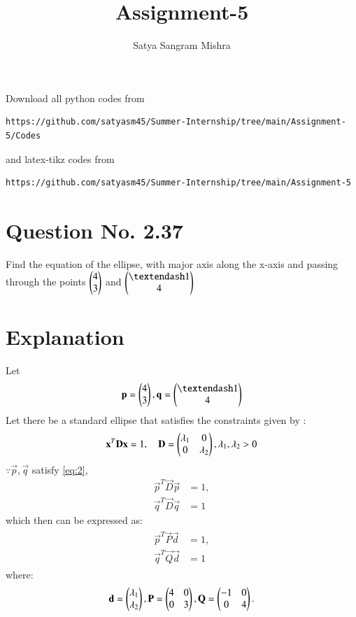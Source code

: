 \documentclass[journal,12pt,twocolumn]{IEEEtran}
\begin{document}
     \def\centbox#1{\makebox[0in]{#1}}
     \def\topbox#1{\raisebox{-\baselineskip}[0in][0in]{#1}}
     \def\midbox#1{\raisebox{-0.5\baselineskip}[0in][0in]{#1}}
\vspace{3cm}
\title{Assignment-5}
\author{Satya Sangram Mishra}
\maketitle
\newpage
\bigskip
\renewcommand{\thefigure}{\theenumi}
\renewcommand{\thetable}{\theenumi}
Download all python codes from 
\begin{lstlisting}
https://github.com/satyasm45/Summer-Internship/tree/main/Assignment-5/Codes
\end{lstlisting}
%
and latex-tikz codes from 
%
\begin{lstlisting}
https://github.com/satyasm45/Summer-Internship/tree/main/Assignment-5
\end{lstlisting}
%
\section{Question No. 2.37}
Find the equation of the ellipse, with major axis along the x-axis and passing through the points $\begin{pmatrix}4\\3\end{pmatrix}$  and $\myvec{– 1\\4}$ 
%
\section{Explanation}
Let 
\begin{align}
\vec{p} = \myvec{4\\3} , \vec{q} = \myvec{– 1\\4}
\end{align}
Let there be a standard ellipse that satisfies the constraints given by :
\begin{align}
\label{eq:2}
\mathbf{x}^T\mathbf{D}\mathbf{x} = 1, \quad \mathbf{D} = \begin{pmatrix}\lambda_1 & 0 \\ 0 & \lambda_2\end{pmatrix}, \lambda_1,\lambda_2 > 0
\end{align}
$\because \vec{p}, \vec{q}$ satisfy \eqref{eq:2},
\begin{align}
\label{eq:ellipse_std_ab}
\vec{p}^T\vec{D}\vec{p} &= 1,
\\
\vec{q}^T\vec{D}\vec{q} &= 1
\end{align}
which then can be expressed as:
\begin{align}
\label{eq:5}
\begin{split}
\vec{p}^T\vec{P}\vec{d} &= 1,
\\
\vec{q}^T\vec{Q}\vec{d} &= 1
\end{split}
\end{align}
where:
\begin{align}
\mathbf{d} = \begin{pmatrix}\lambda_1\\ \lambda_2\end{pmatrix},
\mathbf{P} = \begin{pmatrix}4 & 0 \\ 0 & 3\end{pmatrix},
\mathbf{Q} = \begin{pmatrix}-1 & 0 \\ 0 & 4\end{pmatrix}.
\end{align}
\end{document}
